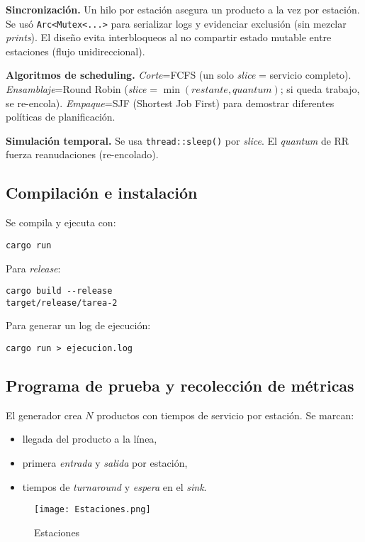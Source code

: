 \documentclass[conference]{IEEEtran}
\begin{document}
\textbf{Sincronización.} Un hilo por estación asegura un producto a la vez por estación. Se usó \texttt{Arc<Mutex<...>} para serializar logs y evidenciar exclusión (sin mezclar \textit{prints}). El diseño evita interbloqueos al no compartir estado mutable entre estaciones (flujo unidireccional).

\textbf{Algoritmos de scheduling.} \textit{Corte}=FCFS (un solo \textit{slice} = servicio completo). \textit{Ensamblaje}=Round Robin (\textit{slice} = $\min(\textit{restante}, \textit{quantum})$; si queda trabajo, se re-encola). \textit{Empaque}=SJF (Shortest Job First) para demostrar diferentes políticas de planificación.

\textbf{Simulación temporal.} Se usa \texttt{thread::sleep()} por \textit{slice}. El \textit{quantum} de RR fuerza reanudaciones (re-encolado).

\subsection{Compilación e instalación}
Se compila y ejecuta con:
\begin{verbatim}
cargo run
\end{verbatim}
Para \textit{release}:
\begin{verbatim}
cargo build --release
target/release/tarea-2
\end{verbatim}
Para generar un log de ejecución:
\begin{verbatim}
cargo run > ejecucion.log
\end{verbatim}

\subsection{Programa de prueba y recolección de métricas}
El generador crea $N$ productos con tiempos de servicio por estación. Se marcan:
\begin{itemize}
  \item llegada del producto a la línea,
  \item primera \textit{entrada} y \textit{salida} por estación,
  \item tiempos de \textit{turnaround} y \textit{espera} en el \textit{sink}.
\end{itemize}

\begin{figure}[H]
    \centering
    \texttt{[image: Estaciones.png]}
    \caption{Estaciones}
\end{figure}
\end{document}

